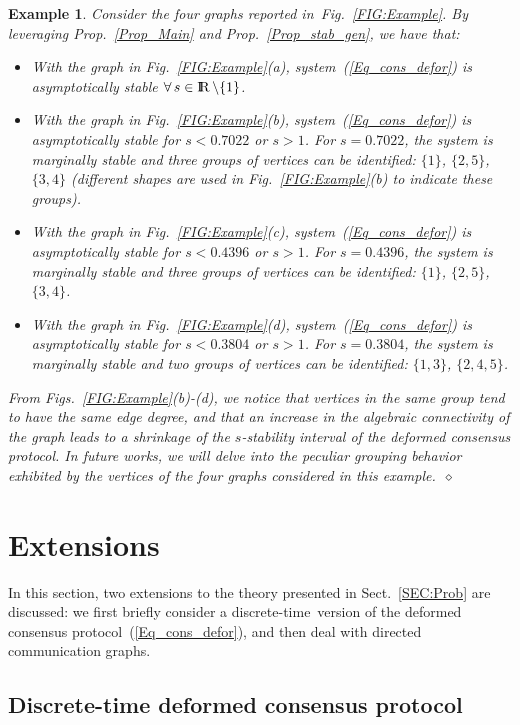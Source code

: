 \documentclass[letterpaper,9pt,twocolumn]{autart}
\newcommand{\rr}{\mathop{{\rm I}\mskip-4.0mu{\rm R}}\nolimits}
\newtheorem{example}{\textbf{Example}}
\begin{document}
\begin{example}\label{Example}
Consider the four graphs reported in~Fig.~\ref{FIG:Example}. By leveraging Prop.~\ref{Prop_Main}
and Prop.~\ref{Prop_stab_gen}, we have that:
\begin{itemize}
\item With the graph in Fig.~\ref{FIG:Example}(a), system~(\ref{Eq_cons_defor})
is asymptotically stable $\forall\, s \in \rr \setminus \{1\}$.
\item With the graph in Fig.~\ref{FIG:Example}(b), system~(\ref{Eq_cons_defor})
is asymptotically stable for $s < 0.7022$ or $s > 1$. For $s = 0.7022$, the
system is marginally stable and three groups of vertices can be identified:
$\{1\}$, $\{2,5\}$, $\{3,4\}$ (different shapes are used in Fig.~\ref{FIG:Example}(b)
to indicate these groups).
\item With the graph in Fig.~\ref{FIG:Example}(c), system~(\ref{Eq_cons_defor})
is asymptotically stable for $s < 0.4396$ or $s > 1$. For $s = 0.4396$,
the system is marginally stable and three groups of vertices can be identified: $\{1\}$, $\{2,5\}$, $\{3,4\}$.
\item With the graph in Fig.~\ref{FIG:Example}(d), system~(\ref{Eq_cons_defor})
is asymptotically stable for $s < 0.3804$ or $s > 1$. For $s = 0.3804$,
the system is marginally stable and two groups of vertices can be identified: $\{1,3\}$, $\{2,4,5\}$.
\end{itemize}
From Figs.~\ref{FIG:Example}(b)-(d), we notice that vertices in the same
group tend to have the same edge degree,
and that an increase in the algebraic connectivity of the graph leads
to a shrinkage of the $s$-stability interval of the deformed consensus
protocol. In future works, we will delve into 
the peculiar grouping behavior exhibited by the vertices of the four
graphs considered in this example.~\hfill$\diamond$
\end{example}


\section{Extensions}\label{Sect:ext}

In this section, two extensions to the theory presented in
Sect.~\ref{SEC:Prob} are discussed: we first briefly consider
a \mbox{discrete-time version} of the deformed consensus 
protocol~(\ref{Eq_cons_defor}), and then deal with directed 
communication graphs.

\subsection{Discrete-time deformed consensus protocol}\label{Sect:ext_DT}
\end{document}
